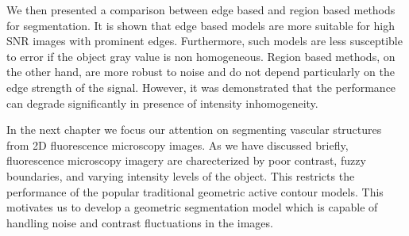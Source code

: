 We then presented a comparison between edge based and region based methods for segmentation. It is shown that edge based models are more suitable for high SNR images with prominent edges. Furthermore, such models are less susceptible to error if the object gray value is non homogeneous. Region based methods, on the other hand, are more robust to noise and do not depend particularly on the edge strength of the signal. However, it was demonstrated that the performance can degrade significantly in presence of intensity inhomogeneity. 

In the next chapter we focus our attention on segmenting vascular structures from 2D fluorescence microscopy images. As we have discussed briefly, fluorescence microscopy imagery are charecterized by poor contrast, fuzzy boundaries, and varying intensity levels of the object.  This restricts the performance of the popular traditional geometric active contour models. This motivates us to develop a geometric segmentation model which is capable of handling noise and contrast fluctuations in the images.

